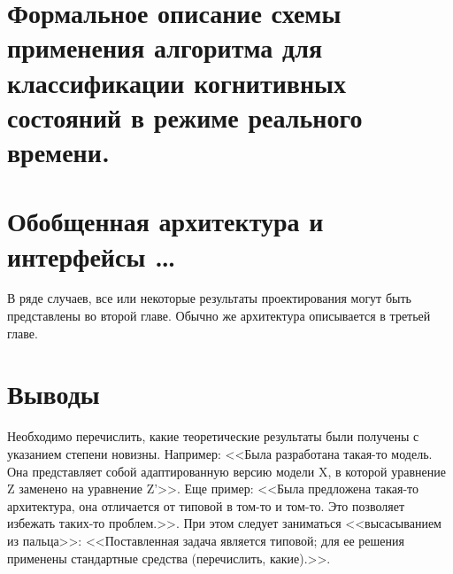 \section{Формальное описание схемы применения алгоритма для классификации когнитивных состояний в режиме реального времени.}


\section{Обобщенная архитектура и интерфейсы \dots}

В ряде случаев, все или некоторые результаты проектирования могут быть представлены во второй главе. Обычно же архитектура описывается в третьей главе.

\section{Выводы}

Необходимо перечислить, какие теоретические результаты были получены с указанием степени новизны. Например: <<Была разработана такая-то модель. Она представляет собой адаптированную версию модели X, в которой уравнение Z заменено на уравнение Z'>>. Еще пример: <<Была предложена такая-то архитектура, она отличается от типовой в том-то и том-то. Это позволяет избежать таких-то проблем.>>. При этом следует заниматься <<высасыванием из пальца>>: <<Поставленная задача является типовой; для ее решения применены стандартные средства (перечислить, какие).>>.